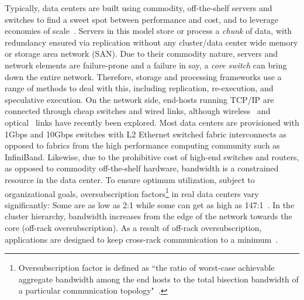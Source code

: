 \documentclass[a4paper,12pt,twoside,openright]{report}
\begin{document}
Typically, data centers are built using commodity, off-the-shelf servers and
switches to find a sweet spot between performance and cost, and to leverage
economies of scale~\cite{Barroso:2003:WSP}. Servers in this model store or
process a \emph{chunk} of data, with redundancy ensured via replication without
any cluster/data center wide memory or storage area network (SAN). Due to their
commodity nature, servers and network elements are failure-prone and a failure
in say, a \emph{core switch} can bring down the entire network. Therefore,
storage and processing frameworks use a range of methods to deal with this,
including replication, re-execution, and speculative execution. On the network
side, end-hosts running TCP/IP are connected through cheap switches and wired
links, although wireless~\cite{Halperin:2011:ADC} and
optical~\cite{Wang:2010:CPO,Farrington:2010:HHE} links have recently been
explored. Most data centers are provisioned with 1Gbps and 10Gbps switches with
L2 Ethernet switched fabric interconnects as opposed to fabrics from the high
performance computing community such as InfiniBand. Likewise, due to the
prohibitive cost of high-end switches and routers, as opposed to commodity
off-the-shelf hardware, bandwidth is a constrained resource in the data center.
To ensure optimum utilization, subject to organizational goals, oversubscription
factors\footnote{Oversubscription factor is defined as ``the ratio of worst-case
achievable aggregate bandwidth among the end hosts to the total bisection
bandwidth of a particular communication topology"~\cite{Al-Fares:2008:SCD}.} in
real data centers vary significantly:
Some are as low as 2:1 while some can get as high as
147:1~\cite{Benson:2010:NTC}. In the cluster hierarchy, bandwidth increases from
the edge of the network towards the core (off-rack oversubscription). As a
result of off-rack oversubscription, applications are designed to keep
cross-rack communication to a minimum~\cite{Dean:2004:MSD}.
\end{document}
